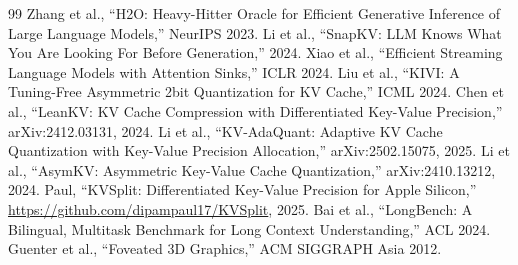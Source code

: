 \documentclass{article}
\begin{document}
\begin{thebibliography}{99}
 Zhang et al., ``H2O: Heavy-Hitter Oracle for Efficient Generative Inference of Large Language Models,'' NeurIPS 2023.
 Li et al., ``SnapKV: LLM Knows What You Are Looking For Before Generation,'' 2024.
 Xiao et al., ``Efficient Streaming Language Models with Attention Sinks,'' ICLR 2024.
 Liu et al., ``KIVI: A Tuning-Free Asymmetric 2bit Quantization for KV Cache,'' ICML 2024.
 Chen et al., ``LeanKV: KV Cache Compression with Differentiated Key-Value Precision,'' arXiv:2412.03131, 2024.
 Li et al., ``KV-AdaQuant: Adaptive KV Cache Quantization with Key-Value Precision Allocation,'' arXiv:2502.15075, 2025.
 Li et al., ``AsymKV: Asymmetric Key-Value Cache Quantization,'' arXiv:2410.13212, 2024.
 Paul, ``KVSplit: Differentiated Key-Value Precision for Apple Silicon,'' \url{https://github.com/dipampaul17/KVSplit}, 2025.
 Bai et al., ``LongBench: A Bilingual, Multitask Benchmark for Long Context Understanding,'' ACL 2024.
 Guenter et al., ``Foveated 3D Graphics,'' ACM SIGGRAPH Asia 2012.
\end{thebibliography}
\end{document}
